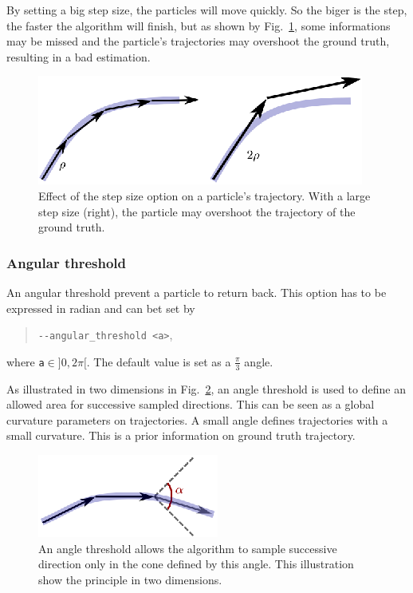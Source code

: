         By setting a big step size, the particles will move quickly. So the biger is the step, the faster the algorithm will finish, but as shown by Fig.~\ref{tracto-fig:stepSize}, some informations may be missed and the particle's trajectories may overshoot the ground truth, resulting in a bad estimation.

        \begin{figure}
            \centering
            \includegraphics[height=0.1\textheight]{stepSize}
            \caption{Effect of the step size option on a particle's trajectory. With a large step size (right), the particle may overshoot the trajectory of the ground truth.}
            \label{tracto-fig:stepSize}
        \end{figure}


    \subsubsection*{Angular threshold}
        An angular threshold prevent a particle to return back. This option has to be expressed in radian and can bet set by
            \begin{quote}
                \texttt{-\hspace{0.1mm}-angular_threshold <a>},
            \end{quote}
        where \texttt{a}$\in]0,2\pi[$. The default value is set as a $\tfrac{\pi}{3}$ angle.

        As illustrated in two dimensions in Fig.~\ref{tracto-fig:angleThreshold}, an angle threshold is used to define an allowed area for successive sampled directions. This can be seen as a global curvature parameters on trajectories. A small angle defines trajectories with a small curvature. This is a prior information on ground truth trajectory.

        \begin{figure}
            \centering
            \includegraphics[height=0.1\textheight]{angleThreshold}
            \caption{An angle threshold allows the algorithm to sample successive direction only in the cone defined by this angle. This illustration show the principle in two dimensions.}
            \label{tracto-fig:angleThreshold}
        \end{figure}


